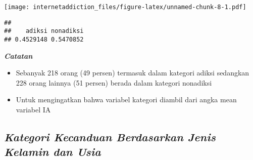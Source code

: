\documentclass[
]{article}
\newenvironment{Shaded}{\begin{snugshade}}{\end{snugshade}}
\newcommand{\DataTypeTok}[1]{\textcolor[rgb]{0.13,0.29,0.53}{#1}}
\newcommand{\KeywordTok}[1]{\textcolor[rgb]{0.13,0.29,0.53}{\textbf{#1}}}
\newcommand{\NormalTok}[1]{#1}
\newcommand{\OperatorTok}[1]{\textcolor[rgb]{0.81,0.36,0.00}{\textbf{#1}}}
\newcommand{\StringTok}[1]{\textcolor[rgb]{0.31,0.60,0.02}{#1}}
\begin{document}
\texttt{[image: internetaddiction\_files/figure-latex/unnamed-chunk-8-1.pdf]}

\begin{Shaded}
\end{Shaded}

\begin{verbatim}
## 
##    adiksi nonadiksi 
## 0.4529148 0.5470852
\end{verbatim}

\textbf{\emph{Catatan}}

\begin{itemize}
\item
  Sebanyak 218 orang (49 persen) termasuk dalam kategori adiksi
  sedangkan 228 orang lainnya (51 persen) berada dalam kategori
  nonadiksi
\item
  Untuk mengingatkan bahwa variabel kategori diambil dari angka mean
  variabel IA
\end{itemize}

\hypertarget{kategori-kecanduan-berdasarkan-jenis-kelamin-dan-usia}{%
\subsection{\texorpdfstring{\emph{Kategori Kecanduan Berdasarkan Jenis
Kelamin dan
Usia}}{Kategori Kecanduan Berdasarkan Jenis Kelamin dan Usia}}\label{kategori-kecanduan-berdasarkan-jenis-kelamin-dan-usia}}

\begin{Shaded}
\end{Shaded}
\end{document}
